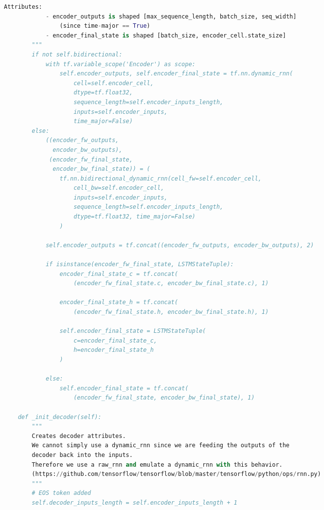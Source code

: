 \begin{landscape}
\begin{multicols}{2}
\begin{lstlisting}[language=Python]
        Attributes:
            - encoder_outputs is shaped [max_sequence_length, batch_size, seq_width]
                (since time-major == True)
            - encoder_final_state is shaped [batch_size, encoder_cell.state_size]
        """
        if not self.bidirectional:
            with tf.variable_scope('Encoder') as scope:
                self.encoder_outputs, self.encoder_final_state = tf.nn.dynamic_rnn(
                    cell=self.encoder_cell,
                    dtype=tf.float32,
                    sequence_length=self.encoder_inputs_length,
                    inputs=self.encoder_inputs,
                    time_major=False)
        else:
            ((encoder_fw_outputs,
              encoder_bw_outputs),
             (encoder_fw_final_state,
              encoder_bw_final_state)) = (
                tf.nn.bidirectional_dynamic_rnn(cell_fw=self.encoder_cell,
                    cell_bw=self.encoder_cell,
                    inputs=self.encoder_inputs,
                    sequence_length=self.encoder_inputs_length,
                    dtype=tf.float32, time_major=False)
                )

            self.encoder_outputs = tf.concat((encoder_fw_outputs, encoder_bw_outputs), 2)

            if isinstance(encoder_fw_final_state, LSTMStateTuple):
                encoder_final_state_c = tf.concat(
                    (encoder_fw_final_state.c, encoder_bw_final_state.c), 1)

                encoder_final_state_h = tf.concat(
                    (encoder_fw_final_state.h, encoder_bw_final_state.h), 1)

                self.encoder_final_state = LSTMStateTuple(
                    c=encoder_final_state_c,
                    h=encoder_final_state_h
                )

            else:
                self.encoder_final_state = tf.concat(
                    (encoder_fw_final_state, encoder_bw_final_state), 1)

    def _init_decoder(self):
        """
        Creates decoder attributes.
        We cannot simply use a dynamic_rnn since we are feeding the outputs of the
        decoder back into the inputs.
        Therefore we use a raw_rnn and emulate a dynamic_rnn with this behavior.
        (https://github.com/tensorflow/tensorflow/blob/master/tensorflow/python/ops/rnn.py)
        """
        # EOS token added
        self.decoder_inputs_length = self.encoder_inputs_length + 1


\end{lstlisting}
\end{multicols}
\end{landscape}
